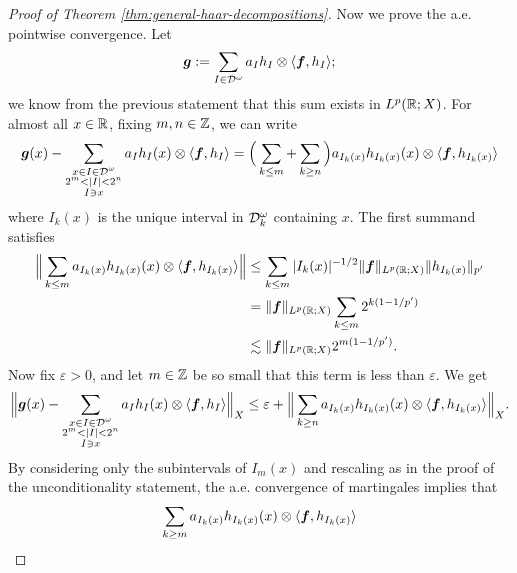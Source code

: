 \begin{proof}[Proof of Theorem \ref{thm:general-haar-decompositions}]
  Now we prove the a.e. pointwise convergence.
  Let
  \begin{equation*}
    \bm{g} := \sum_{I \in \mathcal{D}^{\omega}} a_{I} h_{I} \otimes \langle \bm{f}, h_{I} \rangle;
  \end{equation*}
  we know from the previous statement that this sum exists in $L^p(\mathbb{R};X)$.
  For almost all $x \in \mathbb{R}$, fixing $m,n \in \mathbb{Z}$, we can write
  \begin{equation*}
    \begin{aligned}
    \bm{g}(x) - \sum_{\substack{x \in I \in \mathcal{D}^{\omega} \\ 2^{m} < |I| < 2^{n} \\ I \ni x}} a_{I} h_{I}(x) \otimes \langle \bm{f}, h_{I} \rangle 
    = \Big( \sum_{k \leq m} + \sum_{k \geq n} \Big) a_{I_{k}(x)} h_{I_{k}(x)}(x) \otimes \langle \bm{f}, h_{I_{k}(x)} \rangle
  \end{aligned}
\end{equation*}
where $I_{k}(x)$ is the unique interval in $\mathcal{D}^\omega_{k}$ containing $x$.
The first summand satisfies
\begin{equation*}
  \begin{aligned}
  \Big\| \sum_{k \leq m} a_{I_{k}(x)} h_{I_{k}(x)}(x) \otimes \langle \bm{f}, h_{I_{k}(x)} \rangle \Big\|
  &\leq \sum_{k \leq m} |I_{k}(x)|^{-1/2} \|\bm{f}\|_{L^p(\mathbb{R};X)} \|h_{I_k(x)}\|_{p'} \\
  &=  \|\bm{f}\|_{L^p(\mathbb{R};X)} \sum_{k \leq m}  2^{k(1 - 1/p')} \\
  &\lesssim \|\bm{f}\|_{L^p(\mathbb{R};X)} 2^{m(1 - 1/p')}.
\end{aligned}
\end{equation*}
Now fix $\varepsilon > 0$, and let $m \in \mathbb{Z}$ be so small that this term is less than $\varepsilon$.
We get
\begin{equation*}
  \Big\|  \bm{g}(x) - \sum_{\substack{x \in I \in \mathcal{D}^{\omega} \\ 2^{m} < |I| < 2^{n} \\ I \ni x}} a_{I} h_{I}(x) \otimes \langle \bm{f}, h_{I} \rangle  \Big\|_{X} \leq \varepsilon + \Big\| \sum_{k \geq n} a_{I_{k}(x)} h_{I_{k}(x)}(x) \otimes \langle \bm{f}, h_{I_{k}(x)} \rangle \Big\|_{X}.
\end{equation*}
By considering only the subintervals of $I_{m}(x)$ and rescaling as in the proof of the unconditionality statement, the a.e. convergence of martingales implies that
\begin{equation*}
  \sum_{k \geq m} a_{I_{k}(x)} h_{I_{k}(x)}(x) \otimes \langle \mb{f}, h_{I_{k}(x)} \rangle

\end{equation*}
\end{proof}
